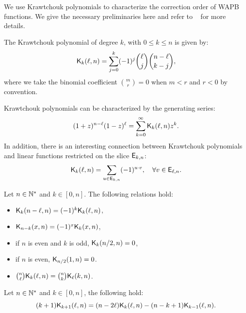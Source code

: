 \documentclass[11pt]{llncs}
\begin{document}
We use Krawtchouk polynomials to characterize the correction order of WAPB functions.
We give the necessary preliminaries here and refer to \eg ~\cite[Ch.5, \S 7]{book:MacSlo78} for more details.

\begin{definition}\label{def:Kraw}
	The Krawtchouk polynomial of degree $k$, with $0\leq k\leq n$ is given by: $$ \displaystyle \mathsf{K}_{k}(\ell,n)=\sum_{j=0}^{k} (-1)^j \binom{\ell}{j} \binom{n-\ell}{k-j},$$
	where we take the binomial coefficient ${m\choose r} = 0$ when $m<r$ and $r<0$ by convention.
\end{definition}
Krawtchouk polynomials can be characterized by the generating series: $$ \displaystyle (1+z)^{n-\ell} (1-z)^\ell=\sum_{k=0}^\infty \mathsf{K}_{k}(\ell,n) z^k.$$ In addition,
there is an interesting connection between Krawtchouk polynomials and linear functions restricted on the slice $\mathsf{E}_{k,n}$:
\begin{equation}\label{Eq_K_rwt}
\mathsf{K}_{k}(\ell,n) = \sum_{u\in \mathsf{E}_{k,n}}(-1)^{ u \cdot v}, \quad \forall v\in \mathsf{E}_{\ell,n}.
\end{equation}








\begin{Prop}\label{prop:Kr}
	Let $n\in \mathbb{N}^*$ and $k\in [0,n]$. The following relations hold:
\begin{itemize}
	\item $\mathsf{K}_{k}(n-\ell,n)=(-1)^k \mathsf{K}_{k}(\ell,n)$,
	\item $\mathsf{K}_{n-k}(x,n)=(-1)^x \mathsf{K}_{k}(x,n)$,
		\item if $n$ is even and $k$ is odd, $\mathsf{K}_{k}(n/2,n)=0$,
	\item if $n$ is even, $\mathsf{K}_{n/2}(1,n)=0$.
	\item $\binom{n}{\ell}\mathsf{K}_{k}(\ell,n)=\binom{n}{k}\mathsf{K}_{\ell}(k,n)$.
	\end{itemize}
\end{Prop}



\begin{Prop}\label{prop:KrDMS}
Let $n\in \mathbb{N}^*$ and $k\in [0,n]$, the following hold:
\[(k+1)\mathsf{K}_{k+1}(\ell,n)=(n-2\ell)\mathsf{K}_{k}(\ell,n)-(n-k+1)\mathsf{K}_{k-1}(\ell,n).\]
\end{Prop}
\end{document}
